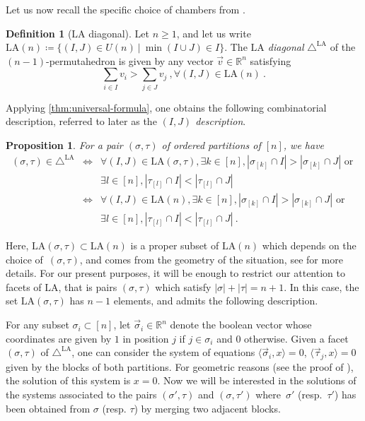 \documentclass{amsart}
\newtheorem{proposition}[theorem]{Proposition}
\theoremstyle{definition}
\newtheorem{definition}[theorem]{Definition}
\newcommand{\R}{\mathbb{R}} %
\newcommand{\LA}{\mathrm{LA}}
\newcommand{\LAD}{\triangle^{\mathrm{LA}}}
\begin{document}
Let us now recall the specific choice of chambers from \cite[Theorem 3.16]{LA21}.

\begin{definition}[$\LA$ diagonal]
    Let $n\geq 1$, and let us write $\LA(n) \coloneqq \{(I,J) \in U(n) \ | \ \min(I\cup J)\in I \}$.
    The \emph{$\LA$ diagonal} $\LAD$ of the $(n-1)$-permutahedron is given by any vector $\vec v \in \R^n$ satisfying  
    \[\sum_{i \in I} v_i > \sum_{j \in J} v_j  \ , \forall (I,J) \in \LA(n) \ . \]
\end{definition}
Applying \cref{thm:universal-formula}, one obtains the following combinatorial description, referred to later as the \emph{$(I,J)$ description}. 
\begin{proposition}
\label{p:minimal}
For a pair $(\sigma,\tau)$ of ordered partitions of $[n]$, we have
\begin{eqnarray*}
    (\sigma,\tau)\in \LAD 
    & \iff & \forall (I,J) \in \LA(\sigma,\tau), \exists k \in [n] , 
    \left| \sigma_{[k]} \cap I \right|
    >
    \left| \sigma_{[k]} \cap J \right| \text{ or } \\
    && \exists l \in [n] , 
    \left| \tau_{[l]} \cap I \right|
    <
    \left| \tau_{[l]} \cap J \right|   \\
    & \iff & \forall (I,J) \in \LA(n), \exists k \in [n] , 
    \left| \sigma_{[k]} \cap I \right|
    >
    \left| \sigma_{[k]} \cap J \right| \text{ or } \\
    && \exists l \in [n] , 
    \left| \tau_{[l]} \cap I \right|
    <
    \left| \tau_{[l]} \cap J \right|  \ . 
\end{eqnarray*}
\end{proposition}
Here, $\LA(\sigma,\tau) \subset \LA(n)$ is a proper subset of $\LA(n)$ which depends on the choice of~$(\sigma,\tau)$, and comes from the geometry of the situation, see \cite[Theorem 1.26]{LA21} for more details.
For our present purposes, it will be enough to restrict our attention to facets of $\LA$, that is pairs $(\sigma,\tau)$ which satisfy $|\sigma| + |\tau|=n+1$.
In this case, the set $\LA(\sigma,\tau)$ has $n-1$ elements, and admits the following description. 

For any subset $\sigma_i \subset [n]$, let $\vec \sigma_i \in \R^n$ denote the boolean vector whose coordinates are given by $1$ in position $j$ if $j \in \sigma_i$ and $0$ otherwise. 
Given a facet $(\sigma,\tau)$ of $\LAD$, one can consider the system of equations $\langle \vec \sigma_i , x \rangle=0$, $\langle \vec \tau_j , x \rangle=0$ given by the blocks of both partitions.
For geometric reasons (see the proof of \cite[Theorem 1.26]{LA21}), the solution of this system is $x=0$. 
Now we will be interested in the solutions of the systems associated to the pairs $(\sigma',\tau)$ and $(\sigma,\tau')$ where~$\sigma'$ (resp.~$\tau'$) has been obtained from $\sigma$ (resp. $\tau$) by merging two adjacent blocks.
\end{document}
